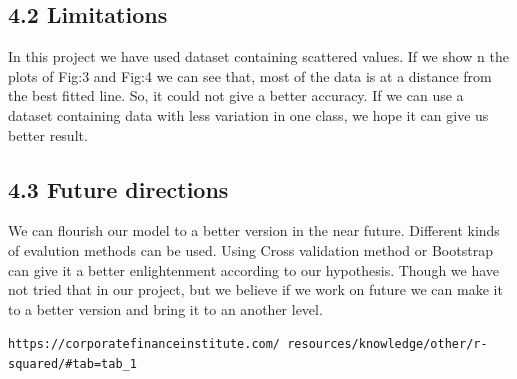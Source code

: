 \documentclass[conference]{IEEEtran}[10]
\begin{document}
\subsection{4.2 Limitations}
In this project we have used dataset containing scattered values. If we show n the plots of Fig:3 and Fig:4 we can see that, most of the data is at a distance from the best fitted line. So, it could not give a better accuracy. If we can use a dataset containing data with less variation in one class, we hope it can give us better result.
\\
\subsection{4.3 Future directions}
We can flourish our model to a better version in the near future. Different kinds of evalution methods can be used. Using Cross validation method or Bootstrap can give it a better enlightenment according to our hypothesis. Though we have not tried that in our project, but we believe if we work on future we can make it to a better version and bring it to an another level.


\medskip
\begin{thebibliography}{99}
\texttt{https://corporatefinanceinstitute.com/
resources/knowledge/other/r-squared/\#tab=tab\_1}

\end{thebibliography}
\end{document}
